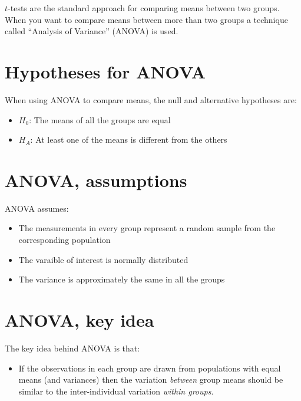 \documentclass[]{book}
\providecommand{\tightlist}{%
  \setlength{\itemsep}{0pt}\setlength{\parskip}{0pt}}
\theoremstyle{definition}
\theoremstyle{definition}
\theoremstyle{definition}
\theoremstyle{remark}
\begin{document}
\(t\)-tests are the standard approach for comparing means between two
groups. When you want to compare means between more than two groups a
technique called ``Analysis of Variance'' (ANOVA) is used.

\hypertarget{hypotheses-for-anova}{%
\section{Hypotheses for ANOVA}\label{hypotheses-for-anova}}

When using ANOVA to compare means, the null and alternative hypotheses
are:

\begin{itemize}
\tightlist
\item
  \(H_0\): The means of all the groups are equal
\item
  \(H_A\): At least one of the means is different from the others
\end{itemize}

\hypertarget{anova-assumptions}{%
\section{ANOVA, assumptions}\label{anova-assumptions}}

ANOVA assumes:

\begin{itemize}
\tightlist
\item
  The measurements in every group represent a random sample from the
  corresponding population
\item
  The varaible of interest is normally distributed
\item
  The variance is approximately the same in all the groups
\end{itemize}

\hypertarget{anova-key-idea}{%
\section{ANOVA, key idea}\label{anova-key-idea}}

The key idea behind ANOVA is that:

\begin{itemize}
\tightlist
\item
  If the observations in each group are drawn from populations with
  equal means (and variances) then the variation \emph{between} group
  means should be similar to the inter-individual variation \emph{within
  groups}.
\end{itemize}
\end{document}
